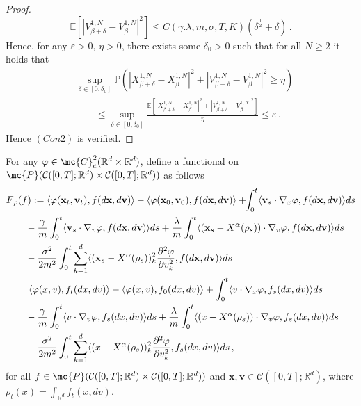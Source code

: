 \documentclass{ims9x6}
\newcommand{\nn}{\nonumber}
\newcommand{\R}{{\mathbb R}}
\newcommand{\CR}{\mathcal{C}([0,T];\mathbb{R}^d)}
\newcommand{\EE}{\mathbb{E}}
\newcommand{\RR}{\mathbb{R}}
\newcommand{\PP}{\mathbb{P}}
\newcommand{\la}{\langle}
\newcommand{\ra}{\rangle}
\begin{document}
\begin{proof}
	\begin{equation}
	\EE[|V_{\beta+\delta}^{1,N}-V_{\beta}^{1,N}|^2]\leq C(\gamma.\lambda,m,\sigma,T,K)\left( \delta^{\frac{1}{2}} + \delta\right)  \,.
	\end{equation}
	Hence, for any $\varepsilon>0$, $\eta>0$, there exists some $\delta_0>0$ such that for all $N\geq 2$ it holds that
	\begin{align}
	&\sup_{\delta\in[0,\delta_0]}\PP\left(|X_{\beta+\delta}^{1,N}-X_{\beta}^{1,N}|^2+|V_{\beta+\delta}^{1,N}-V_{\beta}^{1,N}|^2\geq \eta\right)\nn\\
	&\qquad\leq \sup_{\delta\in[0,\delta_0]}\frac{\EE\left[|X_{\beta+\delta}^{1,N}-X_{\beta}^{1,N}|^2+|V_{\beta+\delta}^{1,N}-V_{\beta}^{1,N}|^2\right]}{\eta}\leq \varepsilon\,.
	\end{align}
	 Hence $(Con 2)$ is verified.
\end{proof}
For any $\varphi\in \mc{C}_c^2(\R^d\times \R^d)$,   define a functional on $\mc{P}(\CR\times \CR)$ as follows
{\small \begin{align*}
	&F_{\varphi}(f)\nn
	:=\la \varphi(\textbf{x}_t,\textbf{v}_t),f(d\textbf{x},d\textbf{v})\ra-\la \varphi(\textbf{x}_0,\textbf{v}_0),f(d\textbf{x},d\textbf{v}) \ra 
	+\!\!\int_0^t\la \textbf{v}_s\cdot\nabla_x\varphi,f(d\textbf{x},d\textbf{v})\ra ds
	\nn\\
	&\qquad -\frac{\gamma}{m}\int_0^t\la \textbf{v}_s\cdot\nabla_v\varphi,f(d\textbf{x},d\textbf{v})\ra ds+\frac{\lambda}{m}\int_0^t\la (\textbf{x}_s-X^\alpha(\rho_s))\cdot \nabla_v\varphi, f(d\textbf{x},d\textbf{v})\ra ds\notag\\
	&\qquad -\frac{\sigma^2}{2m^2}\int_0^t\sum_{k=1}^{d}\la (\textbf{x}_s-X^\alpha(\rho_s))_k^2\frac{\partial^2\varphi}{\partial v_k^2},f (d\textbf{x},d\textbf{v})\ra ds
	\notag\\
	&\quad =\la \varphi(x,v) ,f_t (dx,dv)\ra-\la \varphi(x,v),f_0(dx,dv) \ra +\int_0^t\la v\cdot\nabla_x\varphi,f_s(dx,dv)\ra ds
	\nn\\
	&\qquad -\frac{\gamma}{m}\int_0^t\la v\cdot\nabla_v\varphi,f_s(dx,dv)\ra ds+\frac{\lambda}{m}\int_0^t\la (x-X^\alpha(\rho_s))\cdot \nabla_v\varphi, f_s (dx,dv)\ra ds\notag\\
	&\qquad -\frac{\sigma^2}{2m^2}\int_0^t\sum_{k=1}^{d}\la (x-X^\alpha(\rho_s))_k^2\frac{\partial^2\varphi}{\partial v_k^2},f_s (dx,dv)\ra ds \,,
\end{align*}}
for all $f\in \mc{P}(\CR\times \CR)$ and $\textbf{x},\textbf{v}\in \CR$, where $\rho_t(x)=\int_{ \RR^d }f_t(x,dv)$. 
\end{document}
